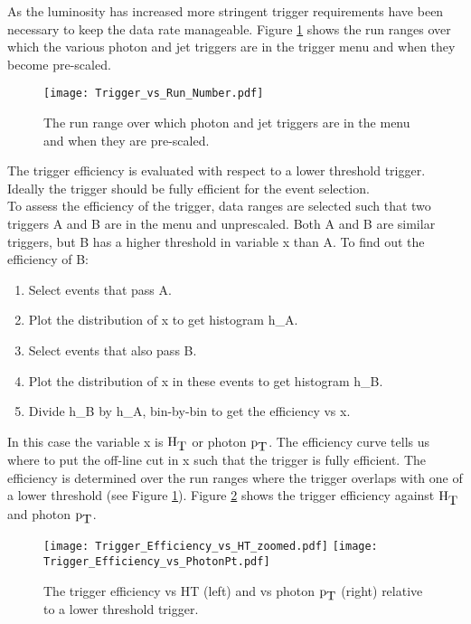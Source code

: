 As the luminosity has increased more stringent trigger requirements have been 
necessary to keep the data rate manageable. Figure
\ref{fig:Trigger_vs_Run_Number} shows the run ranges over which the various
photon and jet triggers are in the trigger menu and when they become pre-scaled.
\\

\begin{figure}
\begin{center}
\texttt{[image: Trigger\_vs\_Run\_Number.pdf]}
\end{center}
\caption{The run range over which photon and jet triggers are in the menu and
when they are pre-scaled.}
\label{fig:Trigger_vs_Run_Number}
\end{figure}

The trigger efficiency is evaluated with respect to a lower threshold trigger.
Ideally the trigger should be fully efficient for the event selection. \\

To assess the efficiency of the trigger, data ranges are selected such that two
triggers A and B are in the menu and unprescaled. Both A and B are similar
triggers, but B has a higher threshold in variable x than A. To find out the 
efficiency of B:

\begin{enumerate}
\item Select events that pass A.
\item Plot the distribution of x to get histogram h\_A.
\item Select events that also pass B.
\item Plot the distribution of x in these events to get histogram h\_B.
\item Divide h\_B by h\_A, bin-by-bin to get the efficiency vs x.
\end{enumerate}

In this case the variable x is $\mbox{H}_{\mbox{T}}$ or photon $\mbox{p}_{\mbox{T}}$. The efficiency curve tells
us where to put the off-line cut in x such that the trigger is fully efficient.
The efficiency is determined over the run ranges where the trigger overlaps with
one of a lower threshold (see Figure \ref{fig:Trigger_vs_Run_Number}). Figure 
\ref{fig:Trigger_Efficiency} shows the trigger efficiency against $\mbox{H}_{\mbox{T}}$ and 
photon $\mbox{p}_{\mbox{T}}$.

\begin{figure}
\texttt{[image: Trigger\_Efficiency\_vs\_HT\_zoomed.pdf]}
\texttt{[image: Trigger\_Efficiency\_vs\_PhotonPt.pdf]}
\caption{The trigger efficiency vs HT (left) and vs photon $\mbox{p}_{\mbox{T}}$ (right)
relative to a lower threshold trigger.}
\label{fig:Trigger_Efficiency}
\end{figure}

